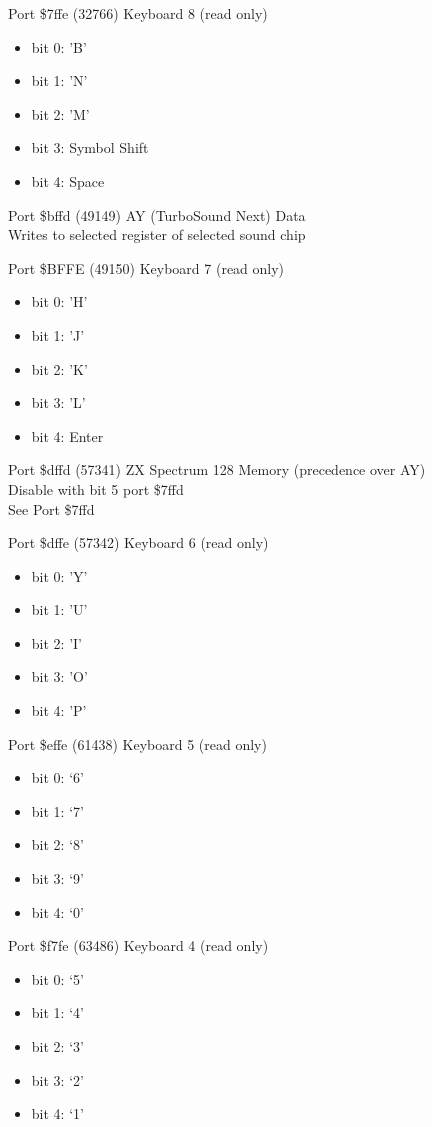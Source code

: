 Port \$7ffe (32766) Keyboard 8 (read only)
\begin{itemize}
\item[] bit 0: 'B'
\item[] bit 1: 'N'
\item[] bit 2: 'M'
\item[] bit 3: Symbol Shift
\item[] bit 4: Space
\end{itemize}

Port \$bffd (49149) AY (TurboSound Next) Data\\
Writes to selected register of selected sound chip

Port \$BFFE (49150) Keyboard 7 (read only)
\begin{itemize}
\item[] bit 0: 'H'
\item[] bit 1: 'J'
\item[] bit 2: 'K'
\item[] bit 3: 'L'
\item[] bit 4: Enter
\end{itemize}

Port \$dffd (57341) ZX Spectrum 128 Memory (precedence over AY)\\
Disable with bit 5 port \$7ffd\\
See Port \$7ffd

Port \$dffe (57342) Keyboard 6 (read only)
\begin{itemize}
\item[] bit 0: 'Y'
\item[] bit 1: 'U'
\item[] bit 2: 'I'
\item[] bit 3: 'O'
\item[] bit 4: 'P'
\end{itemize}

Port \$effe (61438) Keyboard 5 (read only)
\begin{itemize}
\item[] bit 0: ‘6’
\item[] bit 1: ‘7’
\item[] bit 2: ‘8’
\item[] bit 3: ‘9’
\item[] bit 4: ‘0’
\end{itemize}

Port \$f7fe (63486) Keyboard 4 (read only)
\begin{itemize}
\item[] bit 0: ‘5’
\item[] bit 1: ‘4’
\item[] bit 2: ‘3’
\item[] bit 3: ‘2’
\item[] bit 4: ‘1’
\end{itemize}

